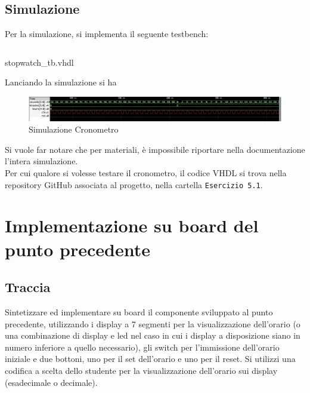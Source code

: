 \subsection{Simulazione}
Per la simulazione, si implementa il seguente testbench:
\begin{code}
    \inputminted[frame=lines, framesep=2mm, baselinestretch=1.2, bgcolor=LightGray, fontsize=\footnotesize, linenos]{vhdl}{vhdl_files/Esercizio_5.1/stopwatch_tb.vhdl}
    \caption{stopwatch\_tb.vhdl}
    \label{lst:stopwatch_tb}
\end{code}

Lanciando la simulazione si ha 
\begin{figure}[H]
	\centering
	\includegraphics[width=1\textwidth]{img/stopwatch_sim}
	\caption{Simulazione Cronometro}
	\label{stpwth_sim} 
\end{figure}
Si vuole far notare che per materiali, è impossibile riportare nella documentazione l'intera simulazione.\\
Per cui qualore si volesse testare il cronometro, il codice VHDL si trova nella repository GitHub associata al progetto, nella cartella \texttt{Esercizio 5.1}.


\section{Implementazione su board del punto precedente}
\subsection{Traccia}
 Sintetizzare ed implementare su board il componente sviluppato al punto precedente, utilizzando i display a 7 segmenti per la visualizzazione dell’orario (o una combinazione di display e led nel caso in cui i display a disposizione siano in numero inferiore a quello necessario), gli switch per l’immissione dell’orario iniziale e due bottoni, uno per il set dell’orario e uno per il reset. Si utilizzi una codifica a scelta dello studente per la visualizzazione dell’orario sui display (esadecimale o decimale).
